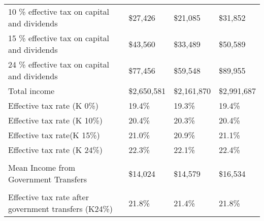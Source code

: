 \documentclass[12pt]{article}
\begin{document}
\begin{table}[]
\begin{tabular}{llll}
10 \% effective tax on capital and dividends          & \$27,426                 & \$21,085               & \$31,852    \\
15 \% effective tax on capital and dividends          & \$43,560                 & \$33,489               & \$50,589    \\
24 \% effective tax on capital and dividends          & \$77,456                 & \$59,548               & \$89,955    \\
Total income                                      & \$2,650,581              & \$2,161,870            & \$2,991,687 \\
Effective tax rate (K 0\%)                  & 19.4\%                   & 19.3\%                 & 19.4\%      \\
Effective tax rate (K 10\%)                 & 20.4\%                   & 20.3\%                 & 20.4\%      \\
Effective tax rate(K 15\%)                 & 21.0\%                   & 20.9\%                 & 21.1\%      \\
Effective tax rate (K 24\%)                 & 22.3\%                   & 22.1\%                 & 22.4\%      \\
                                                      &                          &                        &             \\
Mean Income from Government Transfers                 & \$14,024                 & \$14,579               &       \$16,534      \\
                                                      &                          &                        &             \\
Effective tax rate after government transfers (K24\%) & 21.8\%                   & 21.4\%                 & 21.8\%     \\ \hline
\end{tabular}
\end{table}
\end{document}
